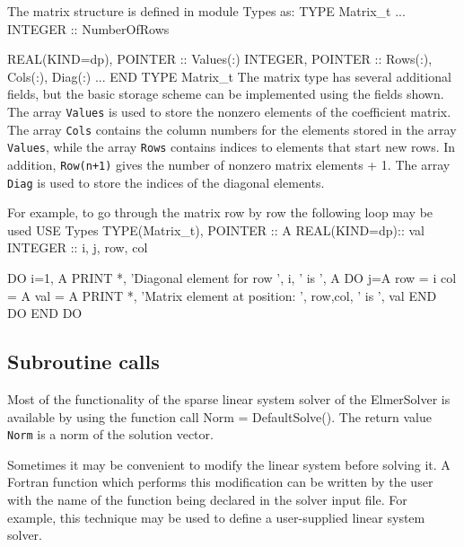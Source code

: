 The matrix structure is defined in module Types as:
\ttbegin
  TYPE Matrix_t
     ...
    INTEGER :: NumberOfRows

    REAL(KIND=dp),  POINTER :: Values(:)
    INTEGER, POINTER :: Rows(:), Cols(:), Diag(:)
     ...
  END TYPE Matrix_t
\ttend
The matrix type has several additional fields, but the basic storage scheme can be implemented  
using the fields shown. The array {\tt Values} is used to store the nonzero elements of
the coefficient matrix. The array {\tt Cols} contains the column numbers for the elements 
stored in the array {\tt Values}, while the array {\tt Rows} contains indices to 
elements that start new rows. In addition, 
{\tt Row(n+1)} gives the number of nonzero matrix elements + 1. 
The array {\tt Diag} is used to store the indices of the diagonal elements. 

For example, to go through the matrix row by row the 
following loop may be used
\ttbegin
  USE Types
  TYPE(Matrix_t), POINTER :: A
  REAL(KIND=dp):: val
  INTEGER :: i, j, row, col

  DO i=1, A %
    PRINT *, 'Diagonal element for row ', i, ' is ', A %
    DO j=A %
       row = i
       col = A %
       val = A %
       PRINT *, 'Matrix element at position: ', row,col, ' is ', val
    END DO
  END DO
\ttend


\subsection{Subroutine calls}

Most of the functionality of the sparse linear system solver of the ElmerSolver is
available by using the function call
\ttbegin
  Norm = DefaultSolve().
\ttend
The return value {\tt Norm} is a norm of the solution vector.

Sometimes it may be convenient to modify the linear system 
before solving it. A Fortran function which performs this modification can be
written by the user with the name of the function being declared in the solver 
input file. For example, this technique may be used to define a user-supplied 
linear system solver. 

